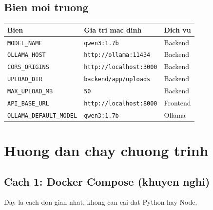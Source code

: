 \documentclass[12pt,a4paper]{article}
\begin{document}
\subsection{Bien moi truong}

\begin{tabularx}{\textwidth}{lXl}
\toprule
\bfseries Bien & \bfseries Gia tri mac dinh & \bfseries Dich vu \\
\midrule
\texttt{MODEL\_NAME} & \texttt{qwen3:1.7b} & Backend \\
\texttt{OLLAMA\_HOST} & \texttt{http://ollama:11434} & Backend \\
\texttt{CORS\_ORIGINS} & \texttt{http://localhost:3000} & Backend \\
\texttt{UPLOAD\_DIR} & \texttt{backend/app/uploads} & Backend \\
\texttt{MAX\_UPLOAD\_MB} & \texttt{50} & Backend \\
\texttt{API\_BASE\_URL} & \texttt{http://localhost:8000} & Frontend \\
\texttt{OLLAMA\_DEFAULT\_MODEL} & \texttt{qwen3:1.7b} & Ollama \\
\bottomrule
\end{tabularx}

\section{Huong dan chay chuong trinh}

\subsection{Cach 1: Docker Compose (khuyen nghi)}

Day la cach don gian nhat, khong can cai dat Python hay Node.
\end{document}
